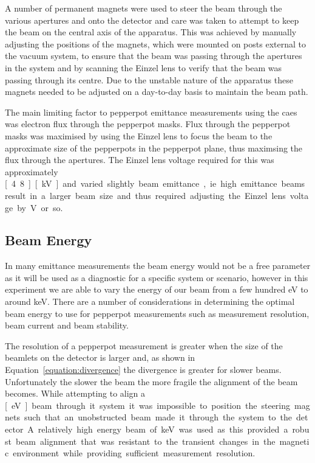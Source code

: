 A number of permanent magnets were used to steer the beam through the various apertures and onto the detector and care was taken to attempt to keep the beam on the central axis of the apparatus.
This was achieved by manually adjusting the positions of the magnets, which were mounted on posts external to the vacuum system, to ensure that the beam was passing through the apertures in the system and by scanning the Einzel lens to verify that the beam was passing through its centre.
Due to the unstable nature of the apparatus these magnets needed to be adjusted on a day-to-day basis to maintain the beam path.

The main limiting factor to pepperpot emittance measurements using the \gls{caes} was electron flux through the pepperpot masks.
Flux through the pepperpot masks was maximised by using the Einzel lens to focus the beam to the approximate size of the pepperpots in the pepperpot plane, thus maximsing the flux through the apertures.
The Einzel lens voltage required for this was approximately \unit[4.8][kV] and varied slightly beam emittance, ie. high emittance beams result in a larger beam size and thus required adjusting the Einzel lens voltage by \unit[100]{V} or so.

\subsection{Beam Energy}
In many emittance measurements the beam energy would not be a free parameter as it will be used as a diagnostic for a specific system or scenario, however in this experiment we are able to vary the energy of our beam from a few hundred eV to around \unit[10]{keV}.
There are a number of considerations in determining the optimal beam energy to use for pepperpot measurements such as measurement resolution, beam current and beam stability.

The resolution of a pepperpot measurement is greater when the size of the beamlets on the detector is larger and, as shown in Equation~\ref{equation:divergence} the divergence is greater for slower beams.
Unfortunately the slower the beam the more fragile the alignment of the beam becomes.
While attempting to align a \unit[500][eV] beam through it system it was impossible to position the steering magnets such that an unobstructed beam made it through the system to the detector.

A relatively high energy beam of \unit[8]{keV} was used as this provided a robust beam alignment that was resistant to the transient changes in the magnetic environment while providing sufficient measurement resolution.

